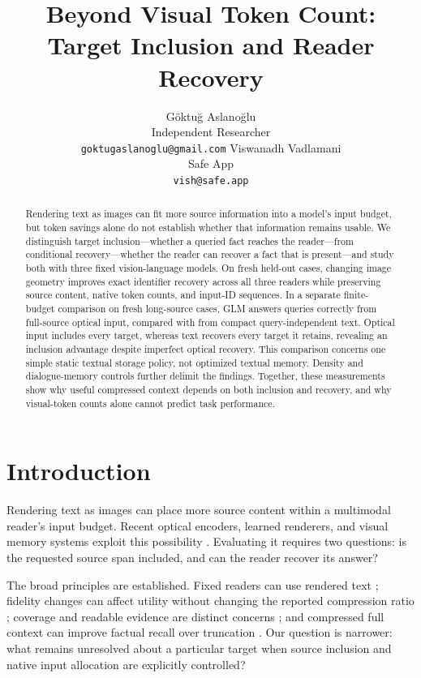 \documentclass{article}
\title{Beyond Visual Token Count: Target Inclusion and Reader Recovery}
\author{G{\"o}ktu{\u{g}} Aslano{\u{g}}lu\\Independent Researcher\\\texttt{goktugaslanoglu@gmail.com} \And Viswanadh Vadlamani\\Safe App\\\texttt{vish@safe.app}}
\begin{document}
\maketitle
{}

\begin{abstract}
Rendering text as images can fit more source information into a model's input budget, but token savings alone do not establish whether that information remains usable. We distinguish target inclusion---whether a queried fact reaches the reader---from conditional recovery---whether the reader can recover a fact that is present---and study both with three fixed vision-language models. On fresh held-out cases, changing image geometry improves exact identifier recovery across all three readers while preserving source content, native token counts, and input-ID sequences. In a separate finite-budget comparison on  fresh long-source cases, GLM answers  queries correctly from full-source optical input, compared with  from compact query-independent text. Optical input includes every target, whereas text recovers every target it retains, revealing an inclusion advantage despite imperfect optical recovery. This comparison concerns one simple static textual storage policy, not optimized textual memory. Density and dialogue-memory controls further delimit the findings. Together, these measurements show why useful compressed context depends on both inclusion and recovery, and why visual-token counts alone cannot predict task performance.
\end{abstract}

\section{Introduction}
Rendering text as images can place more source content within a multimodal reader's input budget. Recent optical encoders, learned renderers, and visual memory systems exploit this possibility \citep{deepseekocr,glyph,vizomem,agentocr,memocr,ocrmemory}. Evaluating it requires two questions: is the requested source span included, and can the reader recover its answer?

The broad principles are established. Fixed readers can use rendered text \citep{textpixels}; fidelity changes can affect utility without changing the reported compression ratio \citep{fico}; coverage and readable evidence are distinct concerns \citep{lensvlm}; and compressed full context can improve factual recall over truncation \citep{badauto}. Our question is narrower: what remains unresolved about a particular target when source inclusion and native input allocation are explicitly controlled?
\end{document}
